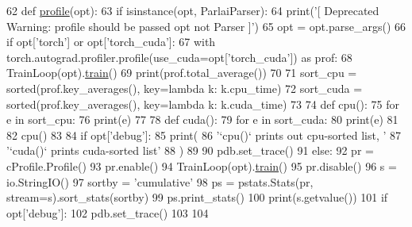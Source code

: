 \begin{DoxyCode}
62 \textcolor{keyword}{def }\hyperlink{namespaceparlai_1_1scripts_1_1profile__train_a72ecdcc9932f8566d611093a2daeaa2a}{profile}(opt):
63     \textcolor{keywordflow}{if} isinstance(opt, ParlaiParser):
64         print(\textcolor{stringliteral}{'[ Deprecated Warning: profile should be passed opt not Parser ]'})
65         opt = opt.parse\_args()
66     \textcolor{keywordflow}{if} opt[\textcolor{stringliteral}{'torch'}] \textcolor{keywordflow}{or} opt[\textcolor{stringliteral}{'torch\_cuda'}]:
67         with torch.autograd.profiler.profile(use\_cuda=opt[\textcolor{stringliteral}{'torch\_cuda'}]) \textcolor{keyword}{as} prof:
68             TrainLoop(opt).\hyperlink{namespaceprojects_1_1mastering__the__dungeon_1_1mturk_1_1tasks_1_1MTD_1_1run_a36a5f4f6f9df0611a6818610518d2cf0}{train}()
69         print(prof.total\_average())
70 
71         sort\_cpu = sorted(prof.key\_averages(), key=\textcolor{keyword}{lambda} k: k.cpu\_time)
72         sort\_cuda = sorted(prof.key\_averages(), key=\textcolor{keyword}{lambda} k: k.cuda\_time)
73 
74         \textcolor{keyword}{def }cpu():
75             \textcolor{keywordflow}{for} e \textcolor{keywordflow}{in} sort\_cpu:
76                 print(e)
77 
78         \textcolor{keyword}{def }cuda():
79             \textcolor{keywordflow}{for} e \textcolor{keywordflow}{in} sort\_cuda:
80                 print(e)
81 
82         cpu()
83 
84         \textcolor{keywordflow}{if} opt[\textcolor{stringliteral}{'debug'}]:
85             print(
86                 \textcolor{stringliteral}{'`cpu()` prints out cpu-sorted list, '}
87                 \textcolor{stringliteral}{'`cuda()` prints cuda-sorted list'}
88             )
89 
90             pdb.set\_trace()
91     \textcolor{keywordflow}{else}:
92         pr = cProfile.Profile()
93         pr.enable()
94         TrainLoop(opt).\hyperlink{namespaceprojects_1_1mastering__the__dungeon_1_1mturk_1_1tasks_1_1MTD_1_1run_a36a5f4f6f9df0611a6818610518d2cf0}{train}()
95         pr.disable()
96         s = io.StringIO()
97         sortby = \textcolor{stringliteral}{'cumulative'}
98         ps = pstats.Stats(pr, stream=s).sort\_stats(sortby)
99         ps.print\_stats()
100         print(s.getvalue())
101         \textcolor{keywordflow}{if} opt[\textcolor{stringliteral}{'debug'}]:
102             pdb.set\_trace()
103 
104 
\end{DoxyCode}
\mbox{\label{namespaceparlai_1_1scripts_1_1profile__train_abc73daf8a16d21ce56906342ec15cda9}} 
